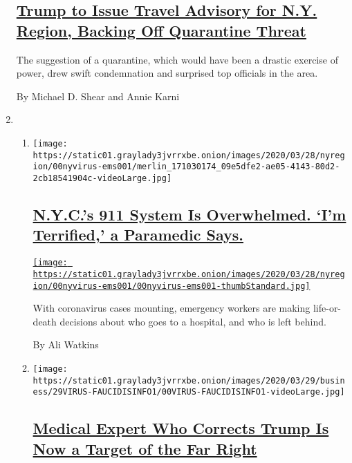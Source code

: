 \begin{enumerate}
{  \subsection{\texorpdfstring{\href{/2020/03/28/us/politics/trump-virginia-comfort-coronavirus.html}{Trump
  to Issue Travel Advisory for N.Y. Region, Backing Off Quarantine
  Threat}}{Trump to Issue Travel Advisory for N.Y. Region, Backing Off Quarantine Threat}}\label{trump-to-issue-travel-advisory-for-ny-region-backing-off-quarantine-threat}}

  The suggestion of a quarantine, which would have been a drastic
  exercise of power, drew swift condemnation and surprised top officials
  in the area.

  By Michael D. Shear and Annie Karni
\item
  \begin{enumerate}
  \def\labelenumii{\arabic{enumii}.}
  \item
    \texttt{[image: https://static01.graylady3jvrrxbe.onion/images/2020/03/28/nyregion/00nyvirus-ems001/merlin\_171030174\_09e5dfe2-ae05-4143-80d2-2cb18541904c-videoLarge.jpg]}

    \hypertarget{nycs-911-system-is-overwhelmed-im-terrified-a-paramedic-says}{%
    \subsection{\texorpdfstring{\href{/2020/03/28/nyregion/nyc-coronavirus-ems.html}{N.Y.C.'s
    911 System Is Overwhelmed. `I'm Terrified,' a Paramedic
    Says.}}{N.Y.C.'s 911 System Is Overwhelmed. `I'm Terrified,' a Paramedic Says.}}\label{nycs-911-system-is-overwhelmed-im-terrified-a-paramedic-says}}

    \href{/2020/03/28/nyregion/nyc-coronavirus-ems.html}{\texttt{[image: https://static01.graylady3jvrrxbe.onion/images/2020/03/28/nyregion/00nyvirus-ems001/00nyvirus-ems001-thumbStandard.jpg]}}

    With coronavirus cases mounting, emergency workers are making
    life-or-death decisions about who goes to a hospital, and who is
    left behind.

    By Ali Watkins
  \item
    \texttt{[image: https://static01.graylady3jvrrxbe.onion/images/2020/03/29/business/29VIRUS-FAUCIDISINFO1/00VIRUS-FAUCIDISINFO1-videoLarge.jpg]}

    \hypertarget{medical-expert-who-corrects-trump-is-now-a-target-of-the-far-right}{%
    \subsection{\texorpdfstring{\href{/2020/03/28/technology/coronavirus-fauci-trump-conspiracy-target.html}{Medical
    Expert Who Corrects Trump Is Now a Target of the Far
    Right}}{Medical Expert Who Corrects Trump Is Now a Target of the Far Right}}\label{medical-expert-who-corrects-trump-is-now-a-target-of-the-far-right}}


\end{enumerate}
\end{enumerate}
